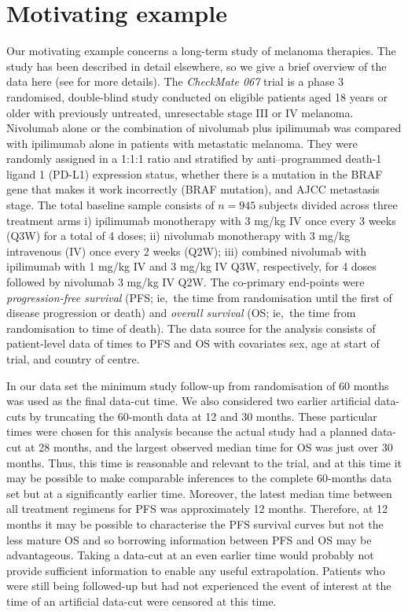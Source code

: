 \documentclass[AMA,STIX1COL]{WileyNJD-v2}
\begin{document}
\section{Motivating example}\label{sec:example}
Our motivating example concerns a long-term study of melanoma therapies.
The study has been described in detail elsewhere, so we give a brief overview of the data here (see \citep{Wolchok2017, Larkin2019, Hodi2018} for more details).
The \textit{CheckMate 067} trial is a phase 3 randomised, double-blind study conducted on eligible patients aged 18 years or older with previously untreated, unresectable stage III or IV melanoma.
Nivolumab alone or the combination of nivolumab plus ipilimumab was compared with ipilimumab alone in patients with metastatic melanoma.
They were randomly assigned in a 1:1:1 ratio and stratified by anti–programmed death-1 ligand 1 (PD-L1) expression status, whether there is a mutation in the BRAF gene that makes it work incorrectly (BRAF mutation), and AJCC metastasis stage.
The total baseline sample consists of $n = 945$ subjects divided across three treatment arms
i) ipilimumab monotherapy with 3 mg/kg IV once every 3 weeks (Q3W) for a total of 4 doses;
ii) nivolumab monotherapy with 3 mg/kg intravenous (IV) once every 2 weeks (Q2W);
iii) combined nivolumab with ipilimumab with 1 mg/kg IV and 3 mg/kg IV Q3W, respectively, for 4 doses followed by nivolumab 3 mg/kg IV Q2W.
The co-primary end-points were \textit{progression-free survival} (PFS; ie,~the time from randomisation until the first of disease progression or death) and \textit{overall survival} (OS; ie,~the time from randomisation to time of death).
The data source for the analysis consists of patient-level data of times to PFS and OS with covariates sex, age at start of trial, and country of centre.


In our data set the minimum study follow-up from randomisation of 60 months was used as the final data-cut time.
We also considered two earlier artificial data-cuts by truncating the 60-month data at 12 and 30 months.
These particular times were chosen for this analysis because the actual study had a planned data-cut at 28 months, and the largest observed median time for OS was just over 30 months. Thus, this time is reasonable and relevant to the trial, and at this time it may be possible to make comparable inferences to the complete 60-months data set but at a significantly earlier time.
Moreover, the latest median time between all treatment regimens for PFS was approximately 12 months. Therefore, at 12 months it may be possible to characterise the PFS survival curves but not the less mature OS and so borrowing information between PFS and OS may be advantageous. Taking a data-cut at an even earlier time would probably not provide sufficient information to enable any useful extrapolation.
Patients who were still being followed-up but had not experienced the event of interest at the time of an artificial data-cut were censored at this time.
\end{document}
